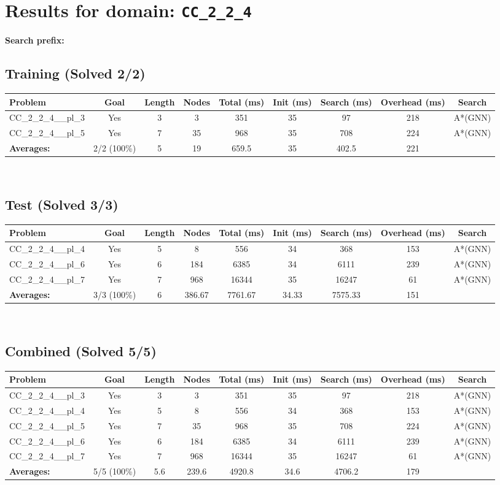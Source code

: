 \documentclass{article}
\begin{document}
\section*{Results for domain: \texttt{CC\_2\_2\_4}}
\textbf{Search prefix:} 
\\[0.5cm]
\subsection*{Training (Solved 2/2)}
\begin{tabular}{lcccccccc}
\toprule
Problem & Goal & Length & Nodes & Total (ms) & Init (ms) & Search (ms) & Overhead (ms) & Search \\
\midrule
CC\_2\_2\_4\_\_pl\_3 & Yes & 3 & 3 & 351 & 35 & 97 & 218 & A*(GNN) \\
CC\_2\_2\_4\_\_pl\_5 & Yes & 7 & 35 & 968 & 35 & 708 & 224 & A*(GNN) \\
\textbf{Averages:} & 2/2 (100\%) & 5 & 19 & 659.5 & 35 & 402.5 & 221 & \\
\bottomrule
\end{tabular}
\\[0.7cm]
\subsection*{Test (Solved 3/3)}
\begin{tabular}{lcccccccc}
\toprule
Problem & Goal & Length & Nodes & Total (ms) & Init (ms) & Search (ms) & Overhead (ms) & Search \\
\midrule
CC\_2\_2\_4\_\_pl\_4 & Yes & 5 & 8 & 556 & 34 & 368 & 153 & A*(GNN) \\
CC\_2\_2\_4\_\_pl\_6 & Yes & 6 & 184 & 6385 & 34 & 6111 & 239 & A*(GNN) \\
CC\_2\_2\_4\_\_pl\_7 & Yes & 7 & 968 & 16344 & 35 & 16247 & 61 & A*(GNN) \\
\textbf{Averages:} & 3/3 (100\%) & 6 & 386.67 & 7761.67 & 34.33 & 7575.33 & 151 & \\
\bottomrule
\end{tabular}
\\[0.7cm]
\subsection*{Combined (Solved 5/5)}
\begin{tabular}{lcccccccc}
\toprule
Problem & Goal & Length & Nodes & Total (ms) & Init (ms) & Search (ms) & Overhead (ms) & Search \\
\midrule
CC\_2\_2\_4\_\_pl\_3 & Yes & 3 & 3 & 351 & 35 & 97 & 218 & A*(GNN) \\
CC\_2\_2\_4\_\_pl\_4 & Yes & 5 & 8 & 556 & 34 & 368 & 153 & A*(GNN) \\
CC\_2\_2\_4\_\_pl\_5 & Yes & 7 & 35 & 968 & 35 & 708 & 224 & A*(GNN) \\
CC\_2\_2\_4\_\_pl\_6 & Yes & 6 & 184 & 6385 & 34 & 6111 & 239 & A*(GNN) \\
CC\_2\_2\_4\_\_pl\_7 & Yes & 7 & 968 & 16344 & 35 & 16247 & 61 & A*(GNN) \\
\textbf{Averages:} & 5/5 (100\%) & 5.6 & 239.6 & 4920.8 & 34.6 & 4706.2 & 179 & \\
\bottomrule
\end{tabular}
\\[0.7cm]
\end{document}
